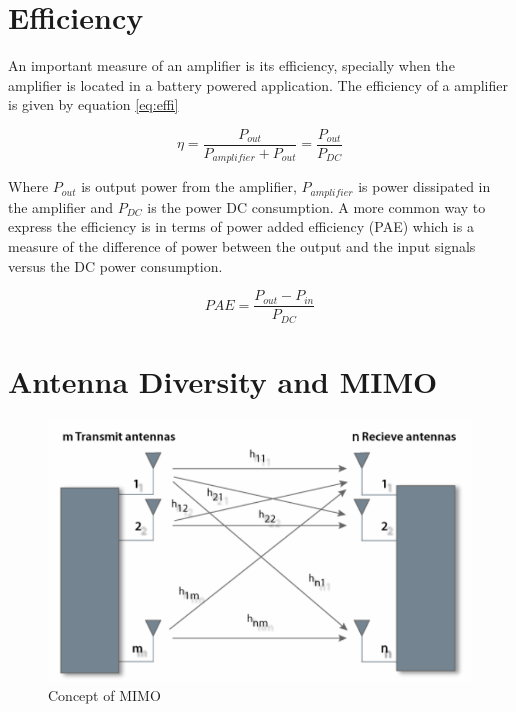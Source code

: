 \section{Efficiency}
An important measure of an amplifier is its efficiency, specially when the amplifier is located in a battery powered application. The efficiency of a amplifier is given by equation \ref{eq:effi}

\begin{equation} \label{eq:effi}
\eta = \frac{P_{out}}{P_{amplifier}+P_{out}} = \frac{P_{out}}{P_{DC}}
\end{equation}

Where $P_{out}$ is output power from the amplifier, $P_{amplifier}$ is power dissipated in the amplifier and $P_{DC}$ is the power DC consumption. A more common way to express the efficiency is in terms of power added efficiency (PAE) which is a measure of the difference of power between the output and the input signals versus the DC power consumption.

\begin{equation} \label{eq:effi2}
PAE = \frac{P_{out}-P_{in}}{P_{DC}}
\end{equation}
 


\section{Antenna Diversity and MIMO}

\begin{figure}[H]
\centering 
\includegraphics[scale = 0.4]{figures/ch1/mimo.png}
\caption{Concept of MIMO \citep{silvus2019}}
\label{fig:mimo}
\end{figure}

